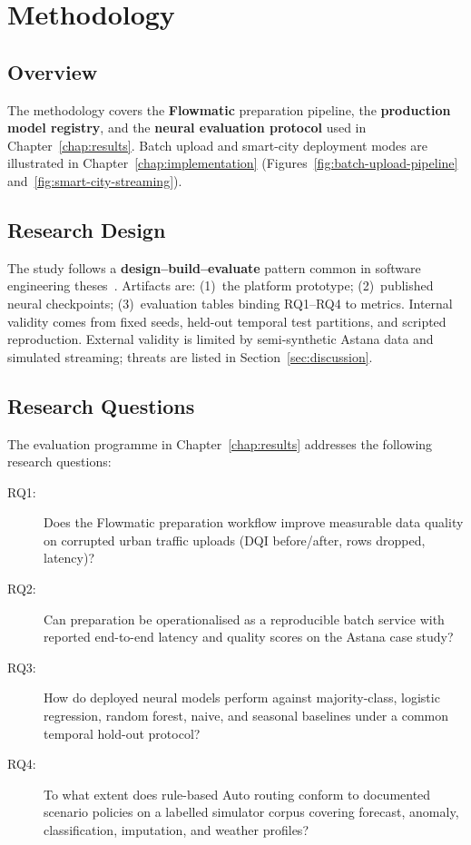 %
%

\chapter{Methodology}
\label{chap:methodology}

\section{Overview}

The methodology covers the \textbf{Flowmatic} preparation pipeline, the \textbf{production model registry}, and the \textbf{neural evaluation protocol} used in Chapter~\ref{chap:results}. Batch upload and smart-city deployment modes are illustrated in Chapter~\ref{chap:implementation} (Figures~\ref{fig:batch-upload-pipeline} and~\ref{fig:smart-city-streaming}).

\section{Research Design}

The study follows a \textbf{design--build--evaluate} pattern common in software engineering theses~\cite{sculley2015hidden,kreutzberger2022mlops}. Artifacts are: (1)~the platform prototype; (2)~published neural checkpoints; (3)~evaluation tables binding RQ1--RQ4 to metrics. Internal validity comes from fixed seeds, held-out temporal test partitions, and scripted reproduction. External validity is limited by semi-synthetic Astana data and simulated streaming; threats are listed in Section~\ref{sec:discussion}.

\section{Research Questions}
\label{sec:research_questions}

The evaluation programme in Chapter~\ref{chap:results} addresses the following research questions:
\begin{description}
  \item[RQ1:] Does the Flowmatic preparation workflow improve measurable data quality on corrupted urban traffic uploads (DQI before/after, rows dropped, latency)?
  \item[RQ2:] Can preparation be operationalised as a reproducible batch service with reported end-to-end latency and quality scores on the Astana case study?
  \item[RQ3:] How do deployed neural models perform against majority-class, logistic regression, random forest, naive, and seasonal baselines under a common temporal hold-out protocol?
  \item[RQ4:] To what extent does rule-based Auto routing conform to documented scenario policies on a labelled simulator corpus covering forecast, anomaly, classification, imputation, and weather profiles?
\end{description}

